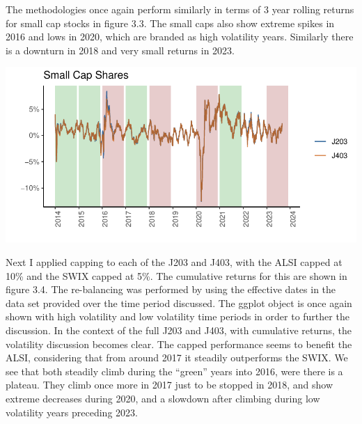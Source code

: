 \documentclass[11pt,preprint, authoryear]{elsarticle}
\let\origfigure\figure
\let\endorigfigure\endfigure
\renewenvironment{figure}[1][2] {
    \expandafter\origfigure\expandafter[H]
} {
    \endorigfigure
}
\numberwithin{equation}{section}
\numberwithin{figure}{section}
\numberwithin{table}{section}
\begin{document}
The methodologies once again perform similarly in terms of 3 year
rolling returns for small cap stocks in figure 3.3. The small caps also
show extreme spikes in 2016 and lows in 2020, which are branded as high
volatility years. Similarly there is a downturn in 2018 and very small
returns in 2023.

\begin{figure}[H]

{\centering \includegraphics{Question-3_files/figure-latex/unnamed-chunk-3-1} 

}

\caption{Small Cap Stocks \label{Figure3.3}}\label{fig:unnamed-chunk-3}
\end{figure}

Next I applied capping to each of the J203 and J403, with the ALSI
capped at 10\% and the SWIX capped at 5\%. The cumulative returns for
this are shown in figure 3.4. The re-balancing was performed by using
the effective dates in the data set provided over the time period
discussed. The ggplot object is once again shown with high volatility
and low volatility time periods in order to further the discussion. In
the context of the full J203 and J403, with cumulative returns, the
volatility discussion becomes clear. The capped performance seems to
benefit the ALSI, considering that from around 2017 it steadily
outperforms the SWIX. We see that both steadily climb during the
``green'' years into 2016, were there is a plateau. They climb once more
in 2017 just to be stopped in 2018, and show extreme decreases during
2020, and a slowdown after climbing during low volatility years
preceding 2023.
\end{document}
